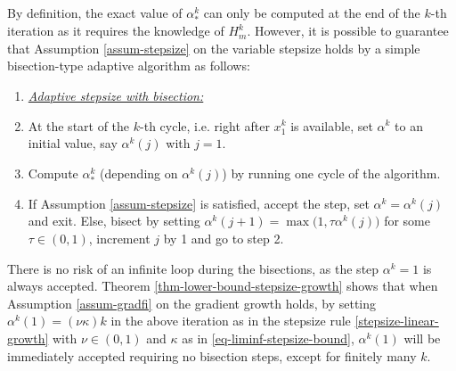 \documentclass[final,numbook]{svjour3}
\begin{document}
\begin{remark}\label{rema-adaptive-stepsize} By definition, the exact value of $\alpha_*^k$ can only be computed at the end of the $k$-th iteration as it requires the knowledge of $H_m^k$. However, it is possible to guarantee that Assumption \ref{assum-stepsize} on the variable stepsize holds by a simple bisection-type adaptive algorithm as follows: 
\begin{enumerate} 
\item [] \textit{\underline{Adaptive stepsize with bisection:}}
\item  At the start of the $k$-th cycle, i.e. right after $x_1^k$  is available, set $\alpha^k$ to an initial value, say $\alpha^k(j)$ with $j=1$. 
\item  Compute $\alpha_*^k$ (depending on $\alpha^k(j)$) by running one cycle of the algorithm.
\item  If Assumption \ref{assum-stepsize} is satisfied, accept the step, set $\alpha^k=\alpha^k(j)$ and exit. Else, bisect by setting $\alpha^k(j+1)=\max\big(1,\tau \alpha^k(j)\big)$ for some $\tau \in (0,1)$, increment $j$ by 1 and go to step 2.
\end{enumerate} 
There is no risk of an infinite loop during the bisections, as the step $\alpha^k=1$ is always accepted. Theorem \ref{thm-lower-bound-stepsize-growth} shows that when Assumption \ref{assum-gradfi} on the gradient growth holds, by setting $\alpha^k(1) = (\nu \kappa) k$ in the above iteration as in the stepsize rule  \eqref{stepsize-linear-growth} with $\nu \in (0,1)$ and $\kappa$ as in \eqref{eq-liminf-stepsize-bound}, $\alpha^k(1)$ will be immediately accepted requiring no bisection steps, except for finitely many $k$. 
\end{remark}
\end{document}
